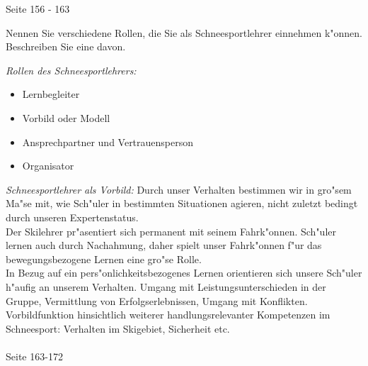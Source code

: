 \begin{solution}
   Seite 156 - 163

\end{solution}

\begin{question}{4}
Nennen Sie verschiedene Rollen, die Sie als Schneesportlehrer einnehmen k"onnen. Beschreiben Sie eine davon. 
\end{question}
\begin{solution}
\emph{Rollen des Schneesportlehrers:}
\begin{itemize}
\item Lernbegleiter
\item Vorbild oder Modell
\item Ansprechpartner und Vertrauensperson
\item Organisator
\end{itemize}
\emph{Schneesportlehrer als Vorbild:}
Durch unser Verhalten bestimmen wir in gro"sem Ma"se mit, wie Sch"uler in bestimmten Situationen agieren, nicht zuletzt bedingt durch unseren Expertenstatus.\\
Der Skilehrer pr"asentiert sich permanent mit seinem Fahrk"onnen. Sch"uler lernen auch durch Nachahmung, daher spielt unser Fahrk"onnen f"ur das bewegungsbezogene Lernen eine gro"se Rolle.\\
In Bezug auf ein pers"onlichkeitsbezogenes Lernen orientieren sich unsere Sch"uler h"aufig an unserem Verhalten. Umgang mit Leistungsunterschieden in der Gruppe, Vermittlung von Erfolgserlebnissen, Umgang mit Konflikten.\\
Vorbildfunktion hinsichtlich weiterer handlungsrelevanter Kompetenzen im Schneesport: Verhalten im Skigebiet, Sicherheit etc.\\\\
 Seite 163-172
\end{solution}

